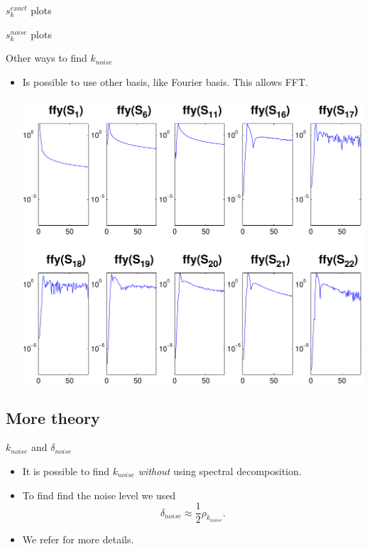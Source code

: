 \documentclass{beamer}
\begin{document}
\begin{frame}{$s_{k}^{exact}$ plots}
  \begin{center}
  \end{center}
\end{frame}

\begin{frame}{$s_{k}^{noise}$ plots}
  \begin{center}
  \end{center}
\end{frame}

\begin{frame}{Other ways to find $k_{noise}$}
  \begin{itemize}
    \item Is possible to use other basis, like Fourier basis. This allows FFT.
      \begin{center}
        \includegraphics[width=0.55\linewidth]{figures/run1/fft_sk}
      \end{center}
  \end{itemize}
\end{frame}

\subsection{More theory}
\begin{frame}{$k_{noise}$ and $\delta_{noise}$}
  \begin{itemize}
    \item It is possible to find $k_{noise}$ \emph{without} using spectral
      decomposition.
    \item To find find the noise level we used
      \begin{equation*}
	\delta_{noise} \approx \frac{1}{2}\rho_{k_{noise}}.
      \end{equation*}
    \item We refer \cite{bidiagonalization} for more details.
  \end{itemize}
\end{frame}
\end{document}
